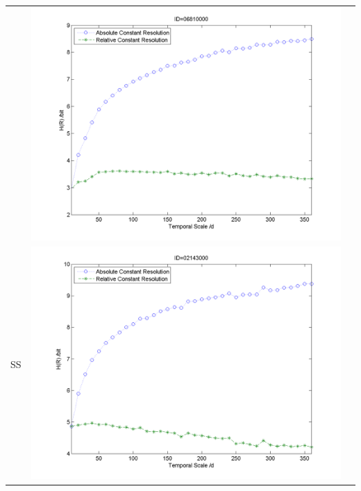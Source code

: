 \documentclass[11pt]{article}
\begin{document}
\begin{table}[H]
{\begin{tabular}{ccc}
&\begin{minipage}{.6\textwidth}\includegraphics[width=\linewidth]{resultgraph/e06810000.png}\end{minipage}
\\
SS
&\begin{minipage}{.6\textwidth}\includegraphics[width=\linewidth]{resultgraph/e02143000.png}\end{minipage}
 

\end{tabular}}
\end{table}
\end{document}
